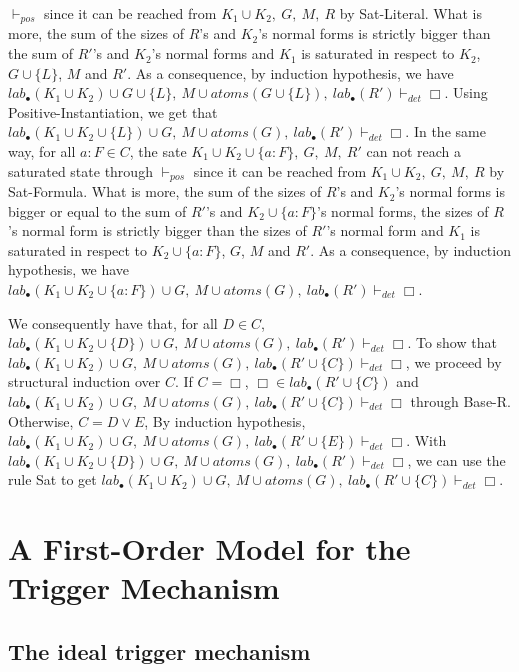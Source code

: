 \documentclass[a4paper,10pt]{report}
\newcommand{\atoms}{\mathit{atoms}}
\newcommand{\pos}{\vdash_\mathit{pos}}
\newcommand{\dett}{\vdash_\mathit{det}}
\newcommand{\T}{\mathit{lab}}
\begin{document}
\begin{itemize}
$\pos$ since it can be reached from $K_1\cup K_2,\ G,\ M,\ R$ by {\sc Sat-Literal}.
What is more, the sum of the sizes of $R$'s and $K_2$'s normal forms
is strictly bigger than the sum of $R'$'s and $K_2$'s
normal forms and $K_1$ is saturated in respect to $K_2$, $G\cup\{L\}$, $M$ and $R'$. As a consequence,
by induction hypothesis, we have $\T_\bullet(K_1\cup K_2)\cup G\cup\{L\},\ M\cup\atoms(G\cup\{L\}),\
\T_\bullet(R')\dett\Box$. Using {\sc Positive-Instantiation}, we get that
$\T_\bullet(K_1\cup K_2\cup\{L\})\cup G,\ M\cup\atoms(G),\ \T_\bullet(R')\dett\Box$.
In the same way, for all $a:F\in C$, the sate $K_1\cup K_2\cup\{a:F\},\ G,\ M,\ R'$ can not reach a
saturated state through $\pos$ since it can be reached from $K_1\cup K_2,\ G,\ M,\ R$ by
{\sc Sat-Formula}. What is more, the sum of the sizes of $R$'s and $K_2$'s normal forms
is bigger or equal to the sum of $R'$'s and $K_2\cup\{a:F\}$'s
normal forms, the sizes of $R$'s normal form is strictly bigger than the sizes of $R'$'s normal form
and $K_1$ is saturated in respect to $K_2\cup\{a:F\}$, $G$, $M$ and $R'$. As a consequence,
by induction hypothesis, we have $\T_\bullet(K_1\cup K_2\cup\{a:F\})\cup G,\ M\cup\atoms(G),\
\T_\bullet(R')\dett\Box$.

We consequently have that, for all $D\in C$, $\T_\bullet(K_1\cup K_2\cup\{D\})\cup G,\ M\cup\atoms(G),\
\T_\bullet(R')\dett\Box$. To show that $\T_\bullet(K_1\cup K_2)\cup G,\ M\cup\atoms(G),\
\T_\bullet(R'\cup\{C\})\dett\Box$, we proceed by structural induction over $C$.
If $C=\Box$, $\Box\in \T_\bullet(R'\cup\{C\})$ and $\T_\bullet(K_1\cup K_2)\cup G,\ M\cup\atoms(G),\
\T_\bullet(R'\cup\{C\})\dett\Box$ through {\sc Base-R}. Otherwise, $C=D\vee E$,
By induction hypothesis, $\T_\bullet(K_1\cup K_2)\cup G,\ M\cup\atoms(G),\
\T_\bullet(R'\cup\{E\})\dett\Box$. With $\T_\bullet(K_1\cup K_2\cup\{D\})\cup G,\ M\cup\atoms(G),\
\T_\bullet(R')\dett\Box$, we can use the rule {\sc Sat} to get
$\T_\bullet(K_1\cup K_2)\cup G,\ M\cup\atoms(G),\ \T_\bullet(R'\cup\{C\})\dett\Box$.
\end{itemize} 

\chapter{A First-Order Model for the Trigger Mechanism}
\section{The ideal trigger mechanism}
\end{document}
